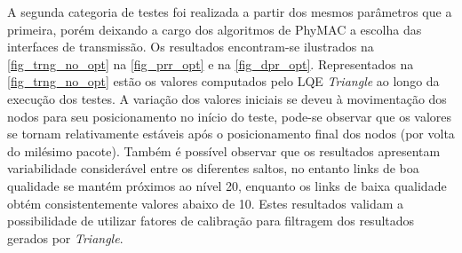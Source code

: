 \documentclass[
	12pt,				%
	openright,			%
	oneside,
	a4paper,			%
	english,			%
	french,				%
	spanish,			%
	brazil				%
	]{abntex2}
\begin{document}
A segunda categoria de testes foi realizada a partir dos mesmos parâmetros que a primeira, porém deixando a cargo dos algoritmos de PhyMAC a escolha das interfaces de transmissão. Os resultados encontram-se ilustrados na \autoref{fig_trng_no_opt} na \autoref{fig_prr_opt} e na \autoref{fig_dpr_opt}. Representados na \autoref{fig_trng_no_opt} estão os valores computados pelo LQE \textit{Triangle} ao longo da execução dos testes. A variação dos valores iniciais se deveu à movimentação dos nodos para seu posicionamento no início do teste, pode-se observar que os valores se tornam relativamente estáveis após o posicionamento final dos nodos (por volta do milésimo pacote). Também é possível observar que os resultados apresentam variabilidade considerável entre os diferentes saltos, no entanto links de boa qualidade se mantém próximos ao nível 20, enquanto os links de baixa qualidade obtém consistentemente valores abaixo de 10. Estes resultados validam a possibilidade de utilizar fatores de calibração para filtragem dos resultados gerados por \textit{Triangle}.
\end{document}
